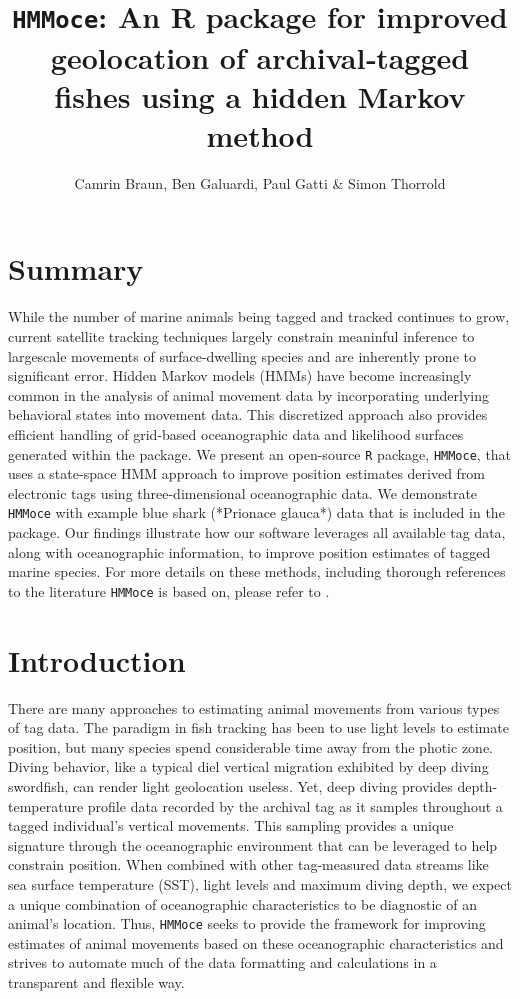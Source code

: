 \documentclass{article}\usepackage[]{graphicx}\usepackage[]{color}
\title{\textbf{\texttt{HMMoce}: An R package for improved geolocation of archival‐tagged fishes using a hidden Markov method}}
\author{Camrin Braun, Ben Galuardi, Paul Gatti \& Simon Thorrold}
\begin{document}
\maketitle



\tableofcontents


\section{Summary}
While the number of marine animals being tagged and tracked continues to grow, current satellite tracking techniques largely constrain meaninful inference to largescale movements of surface-dwelling species and are inherently prone to significant error. Hidden Markov models (HMMs) have become increasingly common in the analysis of animal movement data by incorporating underlying behavioral states into movement data. This discretized approach also provides efficient handling of grid-based oceanographic data and likelihood surfaces generated within the package. We present an open-source \texttt{R} package, \texttt{HMMoce}, that uses a state-space HMM approach to improve position estimates derived from electronic tags using three-dimensional oceanographic data. We demonstrate \texttt{HMMoce} with example blue shark (*Prionace glauca*) data that is included in the package. Our findings illustrate how our software leverages all available tag data, along with oceanographic information, to improve position estimates of tagged marine species. For more details on these methods, including thorough references to the literature \texttt{HMMoce} is based on, please refer to \citep{Braun2018a}.

\section{Introduction}

There are many approaches to estimating animal movements from various types of tag data. The paradigm in fish tracking has been to use light levels to estimate position, but many species spend considerable time away from the photic zone. Diving behavior, like a typical diel vertical migration exhibited by deep diving swordfish, can render light geolocation useless. Yet, deep diving provides depth-temperature profile data recorded by the archival tag as it samples throughout a tagged individual's vertical movements. This sampling provides a unique signature through the oceanographic environment that can be leveraged to help constrain position. When combined with other tag-measured data streams like sea surface temperature (SST), light levels and maximum diving depth, we expect a unique combination of oceanographic characteristics to be diagnostic of an animal's location. Thus, \texttt{HMMoce} seeks to provide the framework for improving estimates of animal movements based on these oceanographic characteristics and strives to automate much of the data formatting and calculations in a transparent and flexible way.
\end{document}
